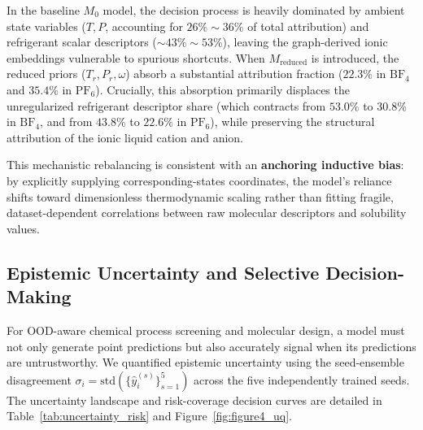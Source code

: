In the baseline $M_0$ model, the decision process is heavily dominated by ambient state variables ($T, P$, accounting for $26\%\sim36\%$ of total attribution) and refrigerant scalar descriptors ($\sim43\%\sim53\%$), leaving the graph-derived ionic embeddings vulnerable to spurious shortcuts. When $M_{\mathrm{reduced}}$ is introduced, the reduced priors ($T_r, P_r, \omega$) absorb a substantial attribution fraction ($22.3\%$ in $\text{BF}_4$ and $35.4\%$ in $\text{PF}_6$). Crucially, this absorption primarily displaces the unregularized refrigerant descriptor share (which contracts from $53.0\%$ to $30.8\%$ in $\text{BF}_4$, and from $43.8\%$ to $22.6\%$ in $\text{PF}_6$), while preserving the structural attribution of the ionic liquid cation and anion. 

This mechanistic rebalancing is consistent with an \textbf{anchoring inductive bias}: by explicitly supplying corresponding-states coordinates, the model's reliance shifts toward dimensionless thermodynamic scaling rather than fitting fragile, dataset-dependent correlations between raw molecular descriptors and solubility values.

\subsection{Epistemic Uncertainty and Selective Decision-Making}
\label{subsec:uncertainty_risk}

For OOD-aware chemical process screening and molecular design, a model must not only generate point predictions but also accurately signal when its predictions are untrustworthy. We quantified epistemic uncertainty using the seed-ensemble disagreement $\sigma_i = \mathrm{std}(\{\hat{y}_i^{(s)}\}_{s=1}^5)$ across the five independently trained seeds. The uncertainty landscape and risk-coverage decision curves are detailed in Table~\ref{tab:uncertainty_risk} and Figure~\ref{fig:figure4_uq}.

